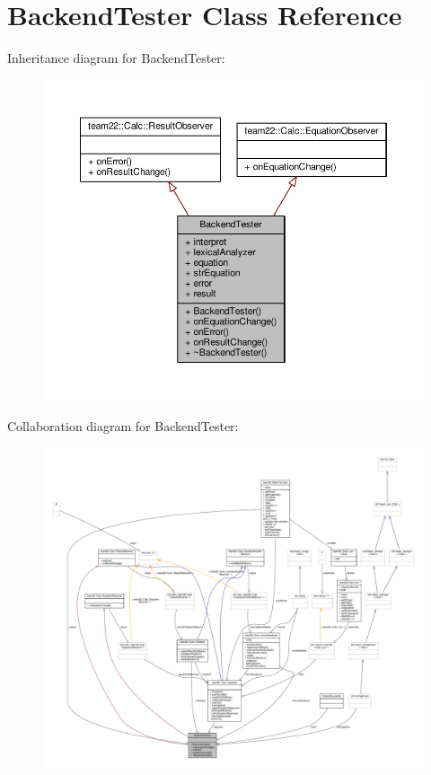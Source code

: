 \hypertarget{class_backend_tester}{}\section{Backend\+Tester Class Reference}
\label{class_backend_tester}


Inheritance diagram for Backend\+Tester\+:
\nopagebreak
\begin{figure}[H]
\begin{center}
\leavevmode
\includegraphics[width=350pt]{class_backend_tester__inherit__graph}
\end{center}
\end{figure}


Collaboration diagram for Backend\+Tester\+:
\nopagebreak
\begin{figure}[H]
\begin{center}
\leavevmode
\includegraphics[width=350pt]{class_backend_tester__coll__graph}
\end{center}
\end{figure}
